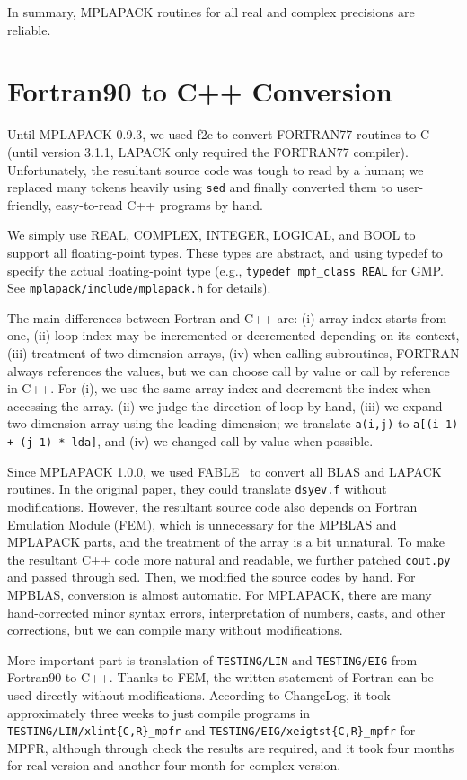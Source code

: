\documentclass[12pt]{article}
\begin{document}
In summary, MPLAPACK routines for all real and complex precisions are reliable.
\section{Fortran90 to C++ Conversion}
\label{sec:howtoconvert}
Until MPLAPACK 0.9.3, we used f2c to convert FORTRAN77 routines to C (until version 3.1.1, LAPACK only required the FORTRAN77 compiler). Unfortunately, the resultant source code was tough to read by a human; we replaced many tokens heavily using {\tt sed} and finally converted them to user-friendly, easy-to-read C++ programs by hand.

We simply use REAL, COMPLEX, INTEGER, LOGICAL, and BOOL to support all floating-point types. These types are abstract, and using typedef to specify the actual floating-point type (e.g., {\tt typedef mpf\_class REAL} for GMP. See {\tt mplapack/include/mplapack.h} for details).

The main differences between Fortran and C++ are: (i) array index starts from one, (ii) loop index may be incremented or decremented depending on its context, (iii) treatment of two-dimension arrays, (iv) when calling subroutines, FORTRAN always references the values, but we can choose call by value or call by reference in C++.  For (i), we use the same array index and decrement the index when accessing the array. (ii) we judge the direction of loop by hand, (iii) we expand two-dimension array using the leading dimension; we translate {\tt a(i,j)} to {\tt a[(i-1)  + (j-1) * lda]}, and (iv) we changed call by value when possible.

Since MPLAPACK 1.0.0, we used FABLE~\cite{fable} to convert all BLAS and LAPACK routines. In the original paper, they could translate {\tt dsyev.f} without modifications. However, the resultant source code also depends on Fortran Emulation Module (FEM), which is unnecessary for the MPBLAS and MPLAPACK parts, and the treatment of the array is a bit unnatural.  To make the resultant C++ code more natural and readable, we further patched {\tt cout.py} and passed through sed. Then, we modified the source codes by hand. For MPBLAS, conversion is almost automatic. For MPLAPACK, there are many hand-corrected minor syntax errors, interpretation of numbers, casts, and other corrections, but we can compile many without modifications.

More important part is translation of {\tt TESTING/LIN} and {\tt TESTING/EIG} from Fortran90 to C++. Thanks to FEM, the written statement of Fortran can be used  directly without modifications. According to ChangeLog, it took approximately three weeks to just compile programs in \\
{\tt TESTING/LIN/xlint\{C,R\}\_mpfr} and {\tt TESTING/EIG/xeigtst\{C,R\}\_mpfr} for MPFR, although through check the results are required, and it took four months for real version and another four-month for complex version.
\end{document}
